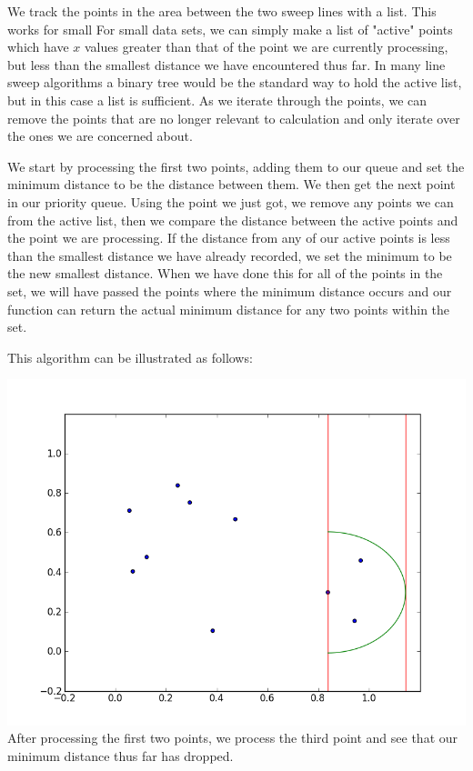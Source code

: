 We track the points in the area between the two sweep lines with a list.  This works for small For small data sets, we can simply make a list of "active" points which have $x$ values greater than that of the point we are currently processing, but less than the smallest distance we have encountered thus far. 
In many line sweep algorithms a binary tree would be the standard way to hold the active list, but in this case a list is sufficient.
As we iterate through the points, we can remove the points that are no longer relevant to calculation and only iterate over the ones we are concerned about.

We start by processing the first two points, adding them to our  queue and set the minimum distance to be the distance between them. 
We then get the next point in our priority queue. 
Using the point we just got, we remove any points we can from the active list, then we compare the distance between the active points and the point we are processing. 
If the distance from any of our active points is less than the smallest distance we have already recorded, we set the minimum to be the new smallest distance. 
When we have done this for all of the points in the set, we will have passed the points where the minimum distance occurs and our function can return the actual minimum distance for any two points within the set.

This algorithm can be illustrated as follows:

\includegraphics[width = \textwidth]{simple1.png}
After processing the first two points, we process the third point and see that our minimum distance thus far has dropped.

